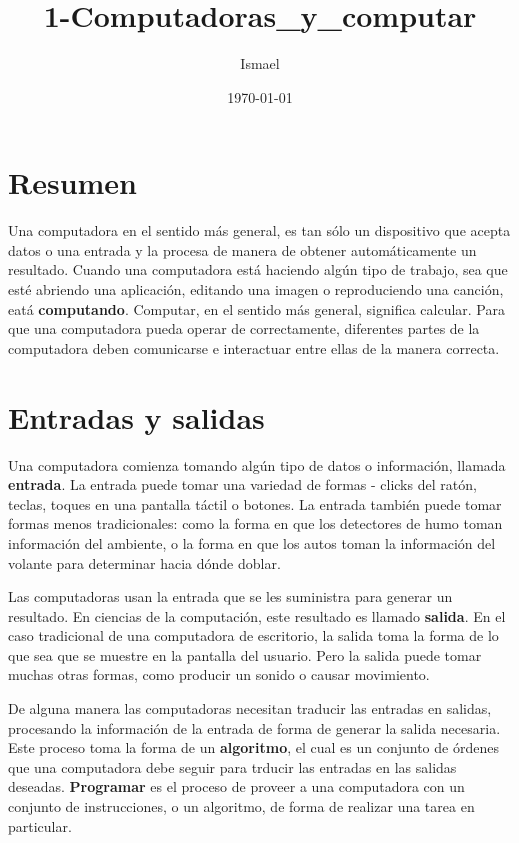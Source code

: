 \documentclass[11pt]{article}
\author{Ismael}
\date{\today}
\title{1-Computadoras\_y\_computar}
\begin{document}
\maketitle
\tableofcontents

\section{Resumen}
\label{sec-1}
Una computadora en el sentido más general, es tan sólo un dispositivo que acepta datos o una entrada y la procesa de manera de obtener automáticamente un resultado. Cuando una computadora está haciendo algún tipo de trabajo, sea que esté abriendo una aplicación, editando una imagen o reproduciendo una canción, eatá \textbf{computando}. Computar, en el sentido más general, significa calcular. Para que una computadora pueda operar de correctamente, diferentes partes de la computadora deben comunicarse e interactuar entre ellas de la manera correcta.

\section{Entradas y salidas}
\label{sec-2}
Una computadora comienza tomando algún tipo de datos o información, llamada \textbf{entrada}. La entrada puede tomar una variedad de formas - clicks del ratón, teclas, toques en una pantalla táctil o botones. La entrada también puede tomar formas menos tradicionales: como la forma en que los detectores de humo toman información del ambiente, o la forma en que los autos toman la información del volante para determinar hacia dónde doblar.

Las computadoras usan la entrada que se les suministra para generar un resultado. En ciencias de la computación, este resultado es llamado \textbf{salida}. En el caso tradicional de una computadora de escritorio, la salida toma la forma de lo que sea que se muestre en la pantalla del usuario. Pero la salida puede tomar muchas otras formas, como producir un sonido o causar movimiento.

De alguna manera las computadoras necesitan traducir las entradas en salidas, procesando la información de la entrada de forma de generar la salida necesaria. Este proceso toma la forma de un \textbf{algoritmo}, el cual es un conjunto de órdenes que una computadora debe seguir para trducir las entradas en las salidas deseadas. \textbf{Programar} es el proceso de proveer a una computadora con un conjunto de instrucciones, o un algoritmo, de forma de realizar una tarea en particular.
\end{document}
